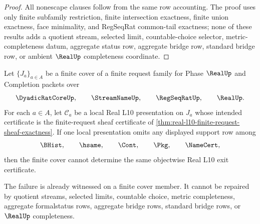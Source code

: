 \begin{proof}
All nonescape clauses follow from the same row accounting. The proof uses only finite subfamily restriction, finite intersection exactness, finite union exactness, face minimality, and RegSeqRat common-tail exactness; none of these results adds a quotient stream, selected limit, countable-choice selector, metric-completeness datum, aggregate status row, aggregate bridge row, standard bridge row, or ambient $\RealUp$ completeness coordinate.
\end{proof}

\begin{theorem}
\label{thm:real-l10-finite-cover-support-removal-obstruction}
Let $\{J_a\}_{a \in A}$ be a finite cover of a finite request family for Phase $\RealUp$ and Completion packets over
$$
\DyadicRatCoreUp,\qquad \StreamNameUp,\qquad \RegSeqRatUp,\qquad \RealUp .
$$
For each $a \in A$, let $\mathcal C_a$ be a local Real L10 presentation on $J_a$ whose intended certificate is the finite-request sheaf certificate of \autoref{thm:real-l10-finite-request-sheaf-exactness}. If one local presentation omits any displayed support row among
$$
\BHist,\qquad \hsame,\qquad \Cont,\qquad \Pkg,\qquad \NameCert,
$$
then the finite cover cannot determine the same objectwise Real L10 exit certificate.

The failure is already witnessed on a finite cover member. It cannot be repaired by quotient streams, selected limits, countable choice, metric completeness, aggregate formalstatus rows, aggregate bridge rows, standard bridge rows, or $\RealUp$ completeness.
\end{theorem}
